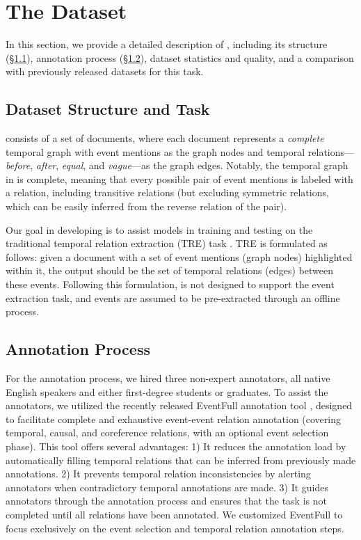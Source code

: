 \section{The \App{} Dataset}
\label{section:dataset}
In this section, we provide a detailed description of \App{}, including its structure (§\ref{section:background:struct}), annotation process (§\ref{section:background:annot-process}), dataset statistics and quality, and a comparison with previously released datasets for this task.


\subsection{Dataset Structure and Task}
\label{section:background:struct}
\App{} consists of a set of documents, where each document represents a \textit{complete} temporal graph with event mentions as the graph nodes and temporal relations—\textit{before}, \textit{after}, \textit{equal}, and \textit{vague}—as the graph edges. Notably, the temporal graph in \App{} is complete, meaning that every possible pair of event mentions is labeled with a relation, including transitive relations (but excluding symmetric relations, which can be easily inferred from the reverse relation of the pair).


Our goal in developing \App{} is to assist models in training and testing on the traditional temporal relation extraction (TRE) task \cite{do-etal-2012-joint, chambers-etal-2014-dense, ning-etal-2018-multi}. TRE is formulated as follows: given a document with a set of event mentions (graph nodes) highlighted within it, the output should be the set of temporal relations (edges) between these events. Following this formulation, \App{} is not designed to support the event extraction task, and events are assumed to be pre-extracted through an offline process.


\subsection{\App{} Annotation Process}
\label{section:background:annot-process}
For the annotation process, we hired three non-expert annotators, all native English speakers and either first-degree students or graduates. To assist the annotators, we utilized the recently released EventFull annotation tool \cite{eirew2024eventfullcompleteconsistentevent}, designed to facilitate complete and exhaustive event-event relation annotation (covering temporal, causal, and coreference relations, with an optional event selection phase). This tool offers several advantages: 1) It reduces the annotation load by automatically filling temporal relations that can be inferred from previously made annotations. 2) It prevents temporal relation inconsistencies by alerting annotators when contradictory temporal annotations are made. 3) It guides annotators through the annotation process and ensures that the task is not completed until all relations have been annotated. We customized EventFull to focus exclusively on the event selection and temporal relation annotation steps.

